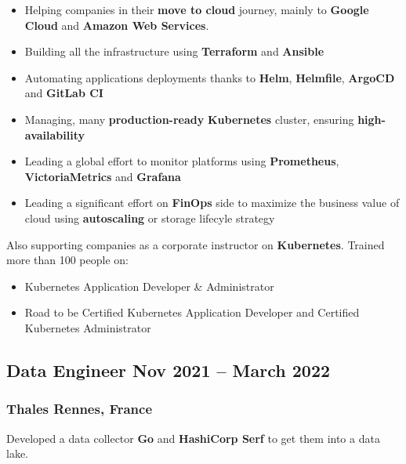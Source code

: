 \documentclass[11pt]{article}
\newcommand{\rside}[1]{
  \hfill {\normalfont\color{gray} #1}%
}
\begin{document}
\begin{itemize}
  \item Helping companies in their \textbf{move to cloud} journey, mainly to \textbf{Google Cloud} and \textbf{Amazon Web Services}.
  \item Building all the infrastructure using \textbf{Terraform} and \textbf{Ansible}
  \item Automating applications deployments thanks to \textbf{Helm}, \textbf{Helmfile}, \textbf{ArgoCD} and \textbf{GitLab CI}
  \item Managing, many \textbf{production-ready} \textbf{Kubernetes} cluster, ensuring \textbf{high-availability}
  \item Leading a global effort to monitor platforms using \textbf{Prometheus}, \textbf{VictoriaMetrics} and \textbf{Grafana}
  \item Leading a significant effort on \textbf{FinOps} side to maximize the business value of cloud using \textbf{autoscaling} or storage lifecyle strategy
\end{itemize}

\begin{justify}
  Also supporting companies as a corporate instructor on \textbf{Kubernetes}.
  Trained more than 100 people on:
  \begin{itemize}
    \item Kubernetes Application Developer \& Administrator
    \item Road to be Certified Kubernetes Application Developer and Certified Kubernetes Administrator
  \end{itemize}
\end{justify}

\subsection{Data Engineer \rside{Nov 2021 -- March 2022}}
\subsubsection{Thales \rside{Rennes, France}}

\begin{justify}
  Developed a data collector \textbf{Go} and \textbf{HashiCorp Serf} to get them into a data lake.
\end{justify}
\vspace{-2mm}
\end{document}
